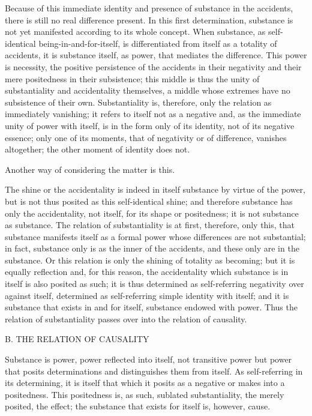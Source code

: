 Because of this immediate identity and presence of substance
in the accidents, there is still no real difference present.
In this first determination, substance is not yet manifested according to its whole concept.
When substance, as self-identical being-in-and-for-itself, is
differentiated from itself as a totality of accidents,
it is substance itself, as power, that mediates the difference.
This power is necessity, the positive persistence of
the accidents in their negativity and their mere positedness in their subsistence;
this middle is thus the unity of substantiality and accidentality
themselves, a middle whose extremes have no subsistence of their own.
Substantiality is, therefore, only the relation as immediately vanishing; it
refers to itself not as a negative and, as the immediate unity of power with
itself, is in the form only of its identity, not of its negative essence; only
one of its moments, that of negativity or of difference, vanishes altogether;
the other moment of identity does not.

Another way of considering the matter is this.

The shine or the accidentality is indeed in itself substance by virtue of the power,
but is not thus posited as this self-identical shine;
and therefore substance has only the accidentality,
not itself, for its shape or positedness;
it is not substance as substance.
The relation of substantiality is at first, therefore, only this,
that substance manifests itself as a formal power whose differences are not substantial;
in fact, substance only is as the inner of the accidents,
and these only are in the substance.
Or this relation is only the shining of totality as becoming;
but it is equally reflection and, for this reason,
the accidentality which substance is in itself is also posited as such;
it is thus determined as self-referring negativity over against itself,
determined as self-referring simple identity with itself;
and it is substance that exists in and for itself,
substance endowed with power.
Thus the relation of substantiality passes over
into the relation of causality.

B. THE RELATION OF CAUSALITY

Substance is power, power reflected into itself,
not transitive power but power that posits determinations
and distinguishes them from itself.
As self-referring in its determining,
it is itself that which it posits as a negative
or makes into a positedness.
This positedness is, as such, sublated substantiality,
the merely posited, the effect;
the substance that exists for itself is, however, cause.

